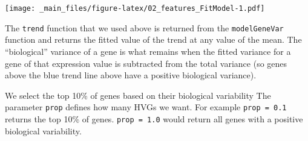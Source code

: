 \documentclass[
]{book}
\newenvironment{Shaded}{\begin{snugshade}}{\end{snugshade}}
\newcommand{\AttributeTok}[1]{\textcolor[rgb]{0.13,0.29,0.53}{#1}}
\newcommand{\DocumentationTok}[1]{\textcolor[rgb]{0.56,0.35,0.01}{\textbf{\textit{#1}}}}
\newcommand{\FloatTok}[1]{\textcolor[rgb]{0.00,0.00,0.81}{#1}}
\newcommand{\FunctionTok}[1]{\textcolor[rgb]{0.13,0.29,0.53}{\textbf{#1}}}
\newcommand{\NormalTok}[1]{#1}
\newcommand{\OtherTok}[1]{\textcolor[rgb]{0.56,0.35,0.01}{#1}}
\newcommand{\SpecialCharTok}[1]{\textcolor[rgb]{0.81,0.36,0.00}{\textbf{#1}}}
\newcommand{\StringTok}[1]{\textcolor[rgb]{0.31,0.60,0.02}{#1}}
\begin{document}
\begin{Shaded}
\end{Shaded}

\texttt{[image: \_main\_files/figure-latex/02\_features\_FitModel-1.pdf]}

The \texttt{trend} function that we used above is returned from the \texttt{modelGeneVar} function and returns the fitted value of the trend at any value of the mean. The ``biological'' variance of a gene is what remains when the fitted variance for a gene of that expression value is subtracted from the total variance (so genes above the blue trend line above have a positive biological variance).

We select the top 10\% of genes based on their biological variability The parameter \texttt{prop} defines how many HVGs we want. For example \texttt{prop\ =\ 0.1} returns the top 10\% of genes. \texttt{prop\ =\ 1.0} would return all genes with a positive biological variability.
\end{document}
